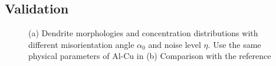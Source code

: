 \documentclass[final,times]{elsarticle}
\numberwithin{equation}{section}
\begin{document}
\subsection{Validation}




 \begin{figure}[!ht]
 \centering
     \hfill
     
     \caption{(a) Dendrite morphologies and concentration distributions with different misorientation angle $\alpha_0$ and noise level $\eta$. Use the same physical parameters of Al-Cu in \cite{Takaki2014}(b) Comparison with the reference \cite{Takaki2014}}
     \label{fig:Ech}
   \end{figure}
   
\end{document}
